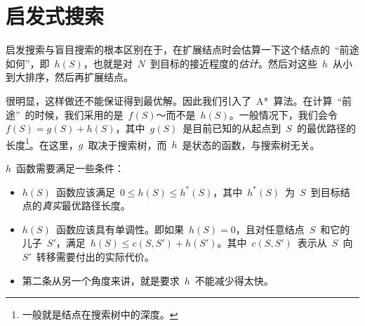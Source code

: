 \section{启发式搜索}
	启发搜索与盲目搜索的根本区别在于，在扩展结点时会估算一下这个结点的~``前途如何''，即~$h(S)$，也就是对~$N$~到目标的接近程度的\emph{估计}。然后对这些~$h$~从小到大排序，然后再扩展结点。
	
	很明显，这样做还不能保证得到最优解。因此我们引入了~A*~算法。在计算~``前途''~的时候，我们采用的是~$f(S)$～而不是~$h(S)$。一般情况下，我们会令~$f(S)=g(S)+h(S)$，其中~$g(S)$~是目前已知的从起点到~$S$~的最优路径的长度\footnote{一般就是结点在搜索树中的深度。}。在这里，$g$~取决于搜索树，而~$h$~是状态的函数，与搜索树无关。
	
	$h$~函数需要满足一些条件：
	
	\begin{itemize}
		\item $h(S)$~函数应该满足~$0 \leqslant h(S) \leqslant h^*(S)$，其中~$h^*(S)$~为~$S$~到目标结点的\emph{真实}最优路径长度。
		\item $h(S)$~函数应该具有单调性。即如果~$h(S)=0$，且对任意结点~$S$~和它的儿子~$S'$，满足~$h(S) \leqslant c(S,S')+h(S')$。其中~$c(S,S')$~表示从~$S$~向~$S'$~转移需要付出的实际代价。
		\item 第二条从另一个角度来讲，就是要求~$h$~不能减少得太快。
	\end{itemize}
	
    
    
